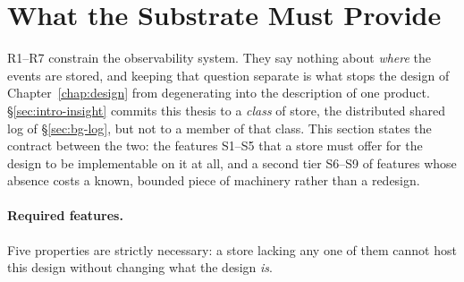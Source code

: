 \section{What the Substrate Must Provide}
\label{sec:problem-substrate}

R1--R7 constrain the observability system. They say nothing about
\emph{where} the events are stored, and keeping that question separate is
what stops the design of Chapter~\ref{chap:design} from degenerating into
the description of one product.
\S\ref{sec:intro-insight} commits this thesis to a \emph{class} of
store, the distributed shared log of \S\ref{sec:bg-log}, but not to a
member of that class. This section states the contract between the two:
the features S1--S5 that a store must offer for the design to be
implementable on it at all, and a second tier S6--S9 of features whose
absence costs a known, bounded piece of machinery rather than a redesign.

\paragraph{Required features.} Five properties are strictly necessary: a
store lacking any one of them cannot host this design without changing what
the design \emph{is}.

